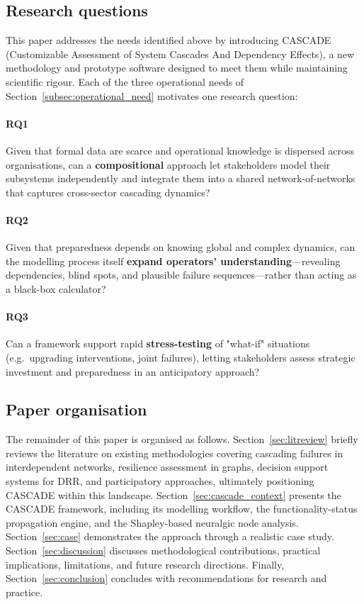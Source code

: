 \documentclass[review,12pt]{elsarticle}
\begin{document}
\subsection{Research questions}
\label{subsec:RQs}
This paper addresses the needs identified above by introducing CASCADE (Customizable Assessment of System Cascades And Dependency Effects), a new methodology and prototype software designed to meet them while maintaining scientific rigour. Each of the three operational needs of Section~\ref{subsec:operational_need} motivates one research question:

\paragraph{RQ1} Given that formal data are scarce and operational knowledge is dispersed across organisations, can a \textbf{compositional} approach let stakeholders model their subsystems independently and integrate them into a shared network-of-networks that captures cross-sector cascading dynamics?

\paragraph{RQ2} Given that preparedness depends on knowing global and complex dynamics, can the modelling process itself \textbf{expand operators' understanding}---revealing dependencies, blind spots, and plausible failure sequences---rather than acting as a black-box calculator?

\paragraph{RQ3} Can a framework support rapid \textbf{stress-testing} of "what-if" situations (e.g.\ upgrading interventions, joint failures), letting stakeholders assess strategic investment and preparedness in an anticipatory approach?


\subsection{Paper organisation}
\label{subsec:organisation}
The remainder of this paper is organised as follows. Section~\ref{sec:litreview} briefly reviews the literature on existing methodologies covering cascading failures in interdependent networks, resilience assessment in graphs, decision support systems for DRR,  and participatory approaches, ultimately positioning CASCADE within this landscape. Section~\ref{sec:cascade_context} presents the CASCADE framework, including its modelling workflow, the functionality-status propagation engine, and the Shapley-based neuralgic node analysis. Section~\ref{sec:case} demonstrates the approach through a realistic case study. Section~\ref{sec:discussion} discusses methodological contributions, practical implications, limitations, and future research directions. Finally, Section~\ref{sec:conclusion} concludes with recommendations for research and practice.
\end{document}
